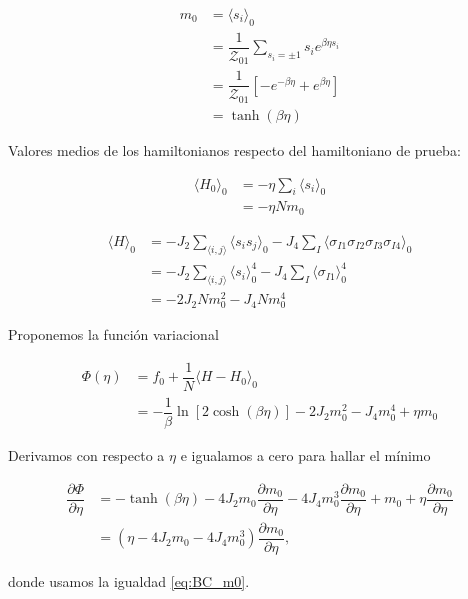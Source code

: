 \documentclass[10pt]{article}
\begin{document}
\begin{align} \label{eq:BC_m0}
m_0 &= \langle s_i \rangle_0 \nonumber \\
&= \dfrac{1}{\mathcal{Z}_{01}} \sum_{s_i=\pm1} s_i e^{\beta \eta s_i} \nonumber \\
&= \dfrac{1}{\mathcal{Z}_{01}} \left[-e^{-\beta \eta} + e^{\beta \eta} \right] \nonumber \\
&= \tanh\left( \beta \eta \right)
\end{align}


Valores medios de los hamiltonianos respecto del hamiltoniano de prueba:

\begin{align}
\langle H_0 \rangle_0 &= -\eta \sum_i \langle s_i \rangle_0  \nonumber \\
&= -\eta N m_0 
\end{align}

\begin{align}
\langle H \rangle_0 &= -J_2 \sum_{\langle i,j\rangle} \langle s_i s_j \rangle_0 - J_4 \sum_I \langle\sigma_{I1}\sigma_{I2}\sigma_{I3}\sigma_{I4} \rangle_0 \nonumber \\
&= -J_2 \sum_{\langle i,j\rangle} \langle s_i\rangle_0^4 - J_4 \sum_I \langle\sigma_{I1}\rangle_0^4  \nonumber \\
&= -2 J_2 N m_0^2 - J_4 N m_0^4 \nonumber
\end{align}

Proponemos la funci\'on variacional 

\begin{align} \label{eq:BC_Phi}
\Phi(\eta) &= f_0 + \dfrac{1}{N} \langle H - H_0 \rangle_0 \nonumber \\
&= -\dfrac{1}{\beta} \ln \left[2 \cosh\left(\beta \eta\right) \right] -2 J_2 m_0^2 - J_4 m_0^4 + \eta m_0
\end{align}

Derivamos con respecto a $\eta$ e igualamos a cero para hallar el m\'inimo

\begin{align}
\dfrac{\partial \Phi}{\partial \eta} &= - \tanh\left(\beta \eta\right) - 4 J_2 m_0 \dfrac{\partial m_0}{\partial \eta} - 4 J_4 m_0^3 \dfrac{\partial m_0}{\partial \eta} + m_0 + \eta \dfrac{\partial m_0}{\partial \eta} \nonumber \\
&= \left(\eta - 4 J_2 m_0 - 4 J_4 m_0^3\right) \dfrac{\partial m_0}{\partial \eta},
\end{align}

donde usamos la igualdad \ref{eq:BC_m0}.
\end{document}
